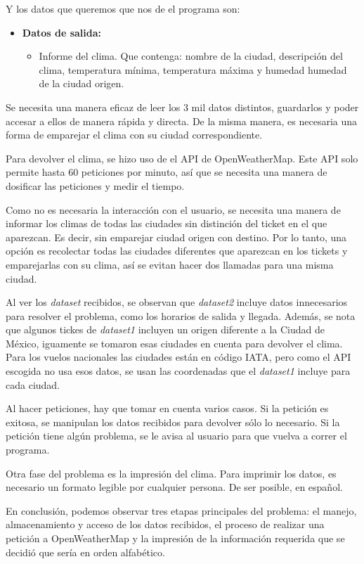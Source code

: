 \documentclass[]{article}
\begin{document}
Y los datos que queremos que nos de el programa son:
\begin{itemize}
	\item \textbf{Datos de salida:}
	\begin{itemize}
		\item Informe del clima. Que contenga: nombre de la ciudad,
		descripción del clima, temperatura mínima, temperatura máxima y
		humedad humedad de la ciudad origen.
	\end{itemize}
\end{itemize}

Se necesita una manera eficaz de leer los 3 mil datos distintos, guardarlos y
poder accesar a ellos de manera rápida y directa. De la misma manera, es
necesaria una forma de emparejar el clima con su ciudad correspondiente.

Para devolver el clima, se hizo uso de el API de OpenWeatherMap. Este API
solo permite hasta 60 peticiones por minuto, así que se necesita una
manera de dosificar las peticiones y medir el tiempo.

Como no es necesaria la interacción con el usuario, se necesita
una manera de informar los climas de todas las ciudades sin distinción del
ticket en el que aparezcan. Es decir, sin emparejar ciudad origen con
destino. Por lo tanto, una opción es recolectar todas las ciudades
diferentes que aparezcan en los tickets y emparejarlas con su clima, así
se evitan hacer dos llamadas para una misma ciudad.

Al ver los \emph{dataset} recibidos, se observan que \emph{dataset2} incluye
datos innecesarios para resolver el problema, como los horarios de salida y
llegada. Además, se nota que algunos tickes de \emph{dataset1} incluyen un
origen diferente a la Ciudad de México, iguamente se tomaron esas ciudades
en cuenta para devolver el clima. Para los vuelos nacionales las ciudades
están en código IATA, pero como el API escogida no usa esos datos, se usan
las coordenadas que el \emph{dataset1} incluye para cada ciudad.

Al hacer peticiones, hay que tomar en cuenta varios casos. Si la petición
es exitosa, se manipulan los datos recibidos para devolver sólo lo
necesario. Si la petición tiene algún problema, se le avisa al usuario para
que vuelva a correr el programa.

Otra fase del problema es la impresión del clima. Para imprimir los datos, es
necesario un formato legible por cualquier persona. De ser posible, en
español.

En conclusión, podemos observar tres etapas principales del problema:
el manejo, almacenamiento y acceso de los datos recibidos, el proceso de
realizar una petición a OpenWeatherMap y la impresión de la información
requerida que se decidió que sería en orden alfabético.
\end{document}
